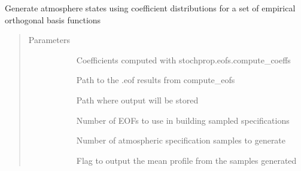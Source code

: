 \documentclass[letterpaper,10pt,english]{sphinxmanual}
\begin{document}
\begin{fulllineitems}
\label{\detokenize{stochprop.eofs:stochprop.eofs.sample_atmo}}
\sphinxAtStartPar
Generate atmosphere states using coefficient distributions for
a set of empirical orthogonal basis functions
\begin{quote}\begin{description}
\item[{Parameters}] \leavevmode\begin{description}
\item[{}] \leavevmode
\sphinxAtStartPar
Coefficients computed with stochprop.eofs.compute\_coeffs

\item[{}] \leavevmode
\sphinxAtStartPar
Path to the .eof results from compute\_eofs

\item[{}] \leavevmode
\sphinxAtStartPar
Path where output will be stored

\item[{}] \leavevmode
\sphinxAtStartPar
Number of EOFs to use in building sampled specifications

\item[{}] \leavevmode
\sphinxAtStartPar
Number of atmospheric specification samples to generate

\item[{}] \leavevmode
\sphinxAtStartPar
Flag to output the mean profile from the samples generated

\end{description}

\end{description}\end{quote}

\end{fulllineitems}
\end{document}
